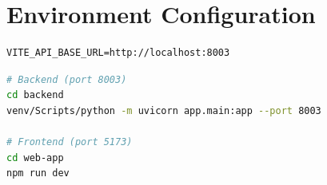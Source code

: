 \documentclass[12pt,a4paper]{report}
\begin{document}
\chapter{Environment Configuration}

\begin{lstlisting}[caption={web-app/.env}]
VITE_API_BASE_URL=http://localhost:8003
\end{lstlisting}

\begin{lstlisting}[language=bash, caption={Starting the development servers}]
# Backend (port 8003)
cd backend
venv/Scripts/python -m uvicorn app.main:app --port 8003

# Frontend (port 5173)
cd web-app
npm run dev
\end{lstlisting}
\end{document}
